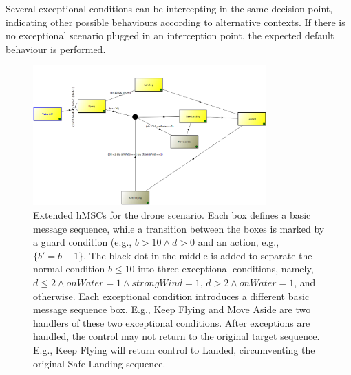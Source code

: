 Several exceptional conditions can be intercepting in the same decision point, indicating other possible behaviours according to alternative contexts. If there is no exceptional scenario plugged in an interception point, the expected default behaviour is performed.
\begin{figure}[h]\centering
 \includegraphics[width=0.8\textwidth]{figures/1-hMSC-Drone.png}
    \caption{Extended hMSCs for the drone scenario. Each box defines a basic message sequence, while a transition between the boxes is marked by a guard condition (e.g., $b>10 \wedge d>0$ and an action, e.g., $\{ b'=b-1\}$. The black dot in the middle is added to separate the normal condition $b\leq 10$ into three exceptional conditions, namely, $d\leq 2 \wedge onWater=1 \wedge strongWind=1$, $d>2 \wedge onWater=1$, and otherwise. Each exceptional condition introduces a different basic message sequence box. 
E.g., Keep Flying and Move Aside are two handlers of these two exceptional conditions. After exceptions are handled, the control may not return to the original target sequence. E.g., Keep Flying will return control to Landed, circumventing the original Safe Landing sequence. }
    \label{fig:hmsc}
    \vspace*{-0.25cm}
\end{figure}

